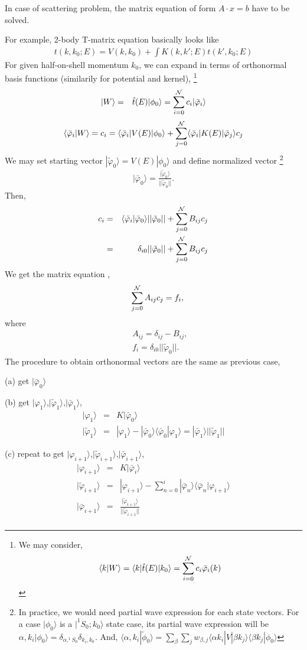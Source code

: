 \documentclass[11pt]{article}
\newcommand{\bea}{\begin{eqnarray}}
\newcommand{\eea}{\end{eqnarray}}
\newcommand{\no}{\nonumber \\}
\newcommand{\la}{\langle}
\newcommand{\ra}{\rangle}
\begin{document}
In case of scattering problem, the matrix equation of form $A\cdot x=b$ have to be
solved. 

For example, 2-body T-matrix equation basically looks like
\bea 
t(k,k_0;E)=V(k,k_0)+\int K(k,k';E)t(k',k_0;E)
\eea 
For given half-on-shell momentum $k_0$, we can expand in terms of orthonormal basis functions
(similarily for potential and kernel),
\footnote{We may consider, 
$$\la k|W\ra= \la k|\hat{t}(E)|k_0\ra = \sum_{i=0}^{\cal N} c_i \bar{\varphi}_i(k) $$
} 
\bea 
|W\ra &=& \hat{t}(E)|\phi_0\ra =\sum_{i=0}^{\cal N} c_i |\bar{\varphi}_i\ra 
\eea 
\bea 
\la \bar{\varphi}_i|W\ra = c_i 
 = \la \bar{\varphi}_i|V(E)|\phi_0\ra 
   +\sum_{j=0}^{\cal N} \la \bar{\varphi}_i|K(E)|\bar{\varphi}_j\ra 
   c_j 
\eea 
We may set starting vector $|\tilde{\varphi}_0\ra=V(E)|\phi_0\ra$ and define normalized vector
\footnote{
In practice, we would need partial wave expression for each state vectors. 
For a case $|\phi_0\ra$ is a $|^1S_0;k_0\ra$ state case, its partial wave 
expression will be
$\alpha, k_i|\phi_0\ra =\delta_{\alpha, ^1S_0}\delta_{k_i,k_0}$. And,
$\la \alpha,k_i|\tilde{\phi}_0\ra = \sum_{\beta}\sum_j w_{\beta,j} \la \alpha k_i|V|\beta k_j \ra
   \la \beta k_j|\phi_0\ra $
} 
\bea 
|\bar{\varphi}_0\ra =\frac{|\tilde{\varphi}_0\ra}{||\tilde{\varphi}_0||}.
\eea 
Then, 
\bea 
c_i&=& \la \bar{\varphi}_i|\bar{\varphi}_0\ra ||\tilde{\varphi}_0||
    +\sum_{j=0}^{\cal N} B_{ij} c_j \no 
   &=& \delta_{i0} ||\tilde{\varphi}_0||+ \sum_{j=0}^{\cal N} B_{ij} c_j
\eea 
We get the matrix equation ,
\bea 
& &\sum_{j=0}^{\cal N} A_{ij} c_j = f_i ,
\eea 
where
\bea  
& & A_{ij}=\delta_{ij}-B_{ij},\no 
& & f_i=\delta_{i0} ||\tilde{\varphi}_0||.
\eea 
The procedure to obtain orthonormal vectors are the same as previous case,

(a) get $|\bar{\varphi}_0\ra $

(b) get $|\varphi_1\ra$,$|\tilde{\varphi}_1\ra$,$|\bar{\varphi}_1\ra$,
   \bea 
   |\varphi_1\ra&=&K|\bar{\varphi}_0\ra \no 
   |\tilde{\varphi}_1\ra &=&|\varphi_1\ra-|\bar{\varphi}_0\ra\la \bar{\varphi}_0|\varphi_1\ra
    =|\bar{\varphi}_1\ra  ||\tilde{\varphi}_1||
   \eea   

(c) repeat to get $|\varphi_{i+1}\ra$,$|\tilde{\varphi}_{i+1}\ra$,$|\bar{\varphi}_{i+1}\ra$,
   \bea 
      |\varphi_{i+1}\ra&=&K|\bar{\varphi}_{i}\ra \no 
      |\tilde{\varphi}_{i+1}\ra
      &=&|\varphi_{i+1}\ra-\sum_{n=0}^{i} |\bar{\varphi}_{n}\ra\la \bar{\varphi}_n|\varphi_{i+1}\ra
      \no 
      |\bar{\varphi}_{i+1}\ra&=&\frac{|\tilde{\varphi}_{i+1}\ra}{ ||\tilde{\varphi}_{i+1}|| }\no 
   \eea 
\end{document}
